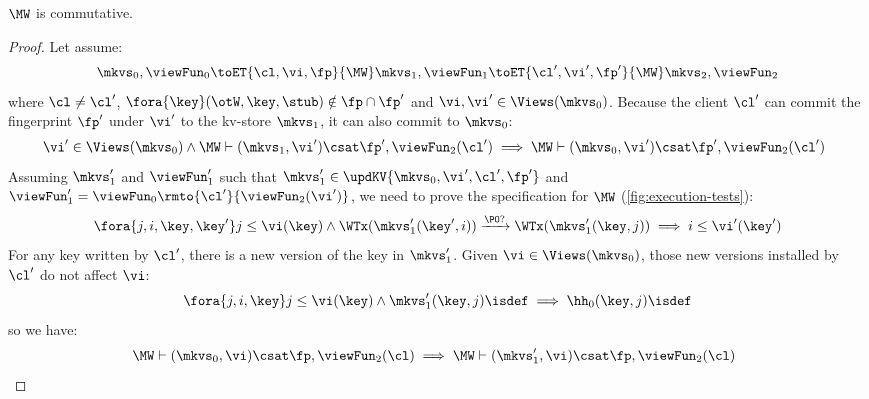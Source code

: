 \begin{lemma}
    \label{lem:mw-comm}
    \(\MW\) is commutative.
\end{lemma}
\begin{proof}
    Let assume:
    \[
        \mkvs_0, \viewFun_0 \toET{\cl, \vi, \fp}{\MW} \mkvs_1, \viewFun_1 \toET{\cl', \vi', \fp'}{\MW} \mkvs_2, \viewFun_2 
    \]
    where \( \cl \neq \cl' \), \( \fora{ \key } (\otW, \key, \stub) \notin \fp \cap \fp' \) and \( \vi, \vi' \in \Views(\mkvs_0)\).
    Because the client \( \cl' \) can commit the fingerprint \( \fp' \) under \( \vi' \) to the kv-store \( \mkvs_1 \), it can also commit to \( \mkvs_0 \):
    \[
        \begin{array}{@{}l}
            \vi' \in \Views(\mkvs_0) \land \MW \vdash (\mkvs_1, \vi') \csat \fp', \viewFun_2(\cl') \implies  \MW \vdash (\mkvs_0, \vi') \csat \fp', \viewFun_2(\cl')
        \end{array}
    \]
    Assuming \( \mkvs'_1 \) and \( \viewFun'_1 \) such that \( \mkvs'_1 \in \updKV{\mkvs_0,\vi',\cl',\fp'} \) and \( \viewFun'_1 = \viewFun_0\rmto{\cl'}{\viewFun_2(\vi')} \), we need to prove the specification for \( \MW \) (\cref{fig:execution-tests}):
    \[
        \fora{j,i, \key, \key'} j \leq \vi(\key) \wedge \WTx(\mkvs'_1(\key', i)) \xrightarrow{\PO ?} \WTx(\mkvs'_1(\key, j)) \implies i \leq \vi'(\key')  \\
    \]
    For any key written by \( \cl' \), there is a new version of the key in \( \mkvs'_1 \).
    Given \( \vi \in \Views(\mkvs_0)\), those new versions installed by \( \cl' \) do not affect \( \vi \):
    \[
        \fora{j,i, \key} j \leq \vi(\key) \land \mkvs'_1(\key, j)\isdef \implies \hh_0(\key, j)\isdef
    \]
    so we have:
    \[
        \begin{array}{@{}l}
            \MW \vdash (\mkvs_0, \vi) \csat \fp, \viewFun_2(\cl) \implies  \MW \vdash (\mkvs'_1, \vi) \csat \fp, \viewFun_2(\cl)
        \end{array}
    \]
\end{proof}


